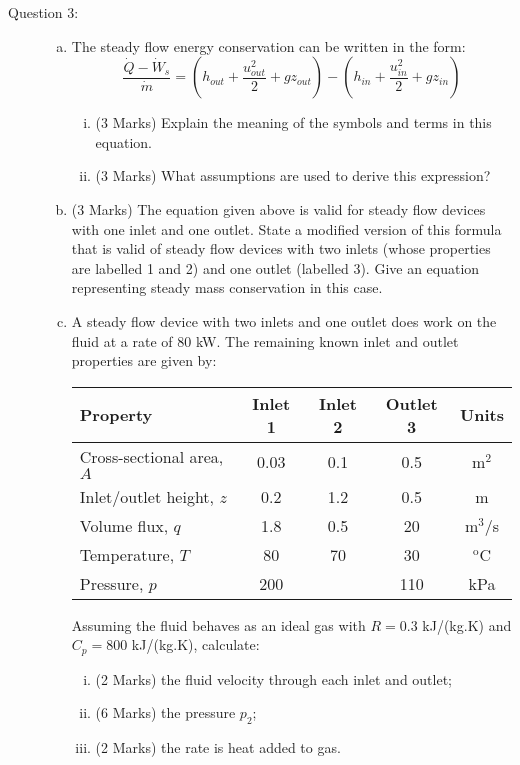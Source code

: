 \documentclass[12pt,twoside]{report}
\newcommand{\frc}{\displaystyle\frac}
\begin{document}
\begin{description}
\item [Question 3:] \mbox{}
\begin{enumerate}[(a)]

\item The steady flow energy conservation can be written in the form:
\begin{displaymath}
\frc{\dot{Q}-\dot{W}_{s}}{\dot{m}} = \left(h_{out} + \frc{u_{out}^{2}}{2}+ g z_{out}\right) - \left(h_{in} + \frc{u_{in}^{2}}{2}+ g z_{in}\right)
\end{displaymath}
\begin{enumerate}[(i)]
\item (3 Marks) Explain the meaning of the symbols and terms in this equation.
\medskip

\item (3 Marks) What assumptions are used to derive this expression?
\end{enumerate}
\item (3 Marks) The equation given above is valid for steady flow devices with one inlet and one outlet. State a modified version of this formula that is valid of steady flow devices with two inlets (whose properties are labelled 1 and 2) and one outlet (labelled 3). Give an equation representing steady mass conservation in this case.

\item  A steady flow device with two inlets and one outlet does work on the fluid at a rate of 80 kW. The remaining known inlet and outlet properties are given by: \\
\begin{center}
\begin{tabular}{||l |c |c |c |c ||}
\hline\hline
{\bf Property}            & {\bf Inlet 1} & {\bf Inlet 2} & {\bf Outlet 3} & {\bf Units} \\
\hline\hline
Cross-sectional area, $A$ & 0.03          & 0.1           & 0.5            & m$^{2}$ \\
Inlet/outlet height, $z$  & 0.2           & 1.2           & 0.5            & m    \\
Volume flux, $q$          & 1.8           & 0.5           & 20             & m$^{3}$/s \\
Temperature, $T$          & 80            & 70            & 30             & $^{\text{o}}$C\\
Pressure, $p$             & 200           &               & 110            & kPa\\
\hline \hline
\end{tabular}
\end{center}
Assuming the fluid behaves as an ideal gas with  $R=0.3$ kJ/(kg.K) and $C_{p}=800$ kJ/(kg.K), calculate:
\begin{enumerate}[(i)]
\item (2 Marks) the fluid velocity through each inlet and outlet; 
\item (6 Marks) the pressure $p_{2}$;
\item (2 Marks) the rate is heat added to gas.
\end{enumerate}
\medskip


\end{enumerate}
\end{description}
\end{document}

